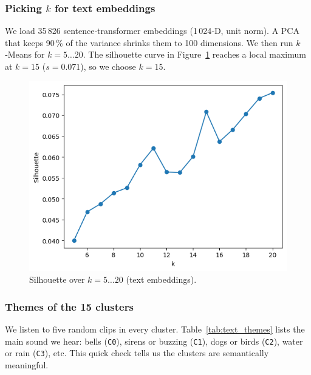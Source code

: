 \documentclass{article}
\begin{document}
\subsubsection{Picking $k$ for text embeddings}
We load 35\,826 sentence‑transformer embeddings (1\,024‑D, unit norm). A PCA that keeps 90\,\% of the variance shrinks them to 100 dimensions. We then run $k$‑Means for $k=5\ldots20$. The silhouette curve in Figure~\ref{fig:text_silhouette} reaches a local maximum at $k=15$ ($s=0.071$), so we choose \textbf{$k=15$}.

\begin{figure}[h]
  \centering
  \includegraphics[width=.40\linewidth]{figs_tang/04_silhouette_k.png}
  \caption{Silhouette over $k=5\ldots20$ (text embeddings).}
  \label{fig:text_silhouette}
\end{figure}

\subsubsection{Themes of the 15 clusters}
We listen to five random clips in every cluster. Table~\ref{tab:text_themes} lists the main sound we hear: bells (\texttt{C0}), sirens or buzzing (\texttt{C1}), dogs or birds (\texttt{C2}), water or rain (\texttt{C3}), etc. This quick check tells us the clusters are semantically meaningful.
\end{document}
